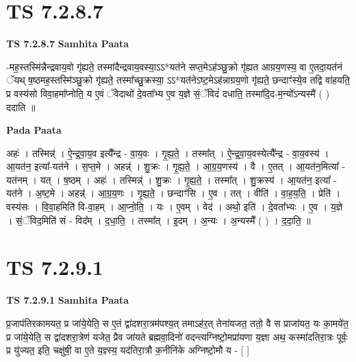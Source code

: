 \documentclass[17pt]{extarticle}
\begin{document}
\section*{ TS 7.2.8.7 }

\textbf{TS 7.2.8.7 } \newline
\textbf{Samhita Paata} \newline

-मह॒स्तस्मि॑न्नैन्द्रवाय॒वो गृ॑ह्यते॒ तस्मा॑दैन्द्रवाय॒वस्या॒ऽऽ*यत॑ने सप्त॒मेऽह॑ञ्छु॒क्रो गृ॑ह्यत आग्रय॒णस्य॒ वा ए॒तदा॒यत॑नं ॅयथ् ष॒ष्ठमह॒स्तस्मि॑ञ्छु॒क्रो गृ॑ह्यते॒ तस्मा᳚च्छु॒क्रस्या॒ ऽऽ*यत॑नेऽष्ट॒मेऽह॑न्नाग्रय॒णो गृ॑ह्यते॒ छन्दाꣳ॑स्ये॒व तद्वि वा॑हयति॒ प्र वस्य॑सो विवा॒हमा᳚प्नोति॒ य ए॒वं ॅवेदाथो॑ दे॒वता᳚भ्य ए॒व य॒ज्ञे सं॒ॅविदं॑ दधाति॒ तस्मा॑दि॒द-म॒न्यो᳚ऽन्यस्मै॑ ( ) ददाति ॥ \newline

\textbf{Pada Paata} \newline

अहः॑ । तस्मिन्न्॑ । ऐ॒न्द्र॒वा॒य॒व इत्यै᳚न्द्र - वा॒य॒वः । गृ॒ह्य॒ते॒ । तस्मा᳚त् । ऐ॒न्द्र॒वा॒य॒वस्येत्यै᳚न्द्र - वा॒य॒वस्य॑ । आ॒यत॑न॒ इत्या᳚-यत॑ने । स॒प्त॒मे । अहन्न्॑ । शु॒क्रः । गृ॒ह्य॒ते॒ । आ॒ग्र॒य॒णस्य॑ । वै । ए॒तत् । आ॒यत॑न॒मित्या᳚ - यत॑नम् । यत् । ष॒ष्ठम् । अहः॑ । तस्मिन्न्॑ । शु॒क्रः । गृ॒ह्य॒ते॒ । तस्मा᳚त् । शु॒क्रस्य॑ । आ॒यत॑न॒ इत्या᳚ - यत॑ने । अ॒ष्ट॒मे । अहन्न्॑ । आ॒ग्र॒य॒णः । गृ॒ह्य॒ते॒ । छन्दाꣳ॑सि । ए॒व । तत् । वीति॑ । वा॒ह॒य॒ति॒ । प्रेति॑ । वस्य॑सः । वि॒वा॒हमिति॑ वि-वा॒हम् । आ॒प्नो॒ति॒ । यः । ए॒वम् । वेद॑ । अथो॒ इति॑ । दे॒वता᳚भ्यः । ए॒व । य॒ज्ञे । सं॒ॅविद॒मिति॑ सं - विद᳚म् । द॒धा॒ति॒ । तस्मा᳚त् । इ॒दम् । अ॒न्यः । अ॒न्यस्मै᳚ ( ) । द॒दा॒ति॒ ॥  \newline




\section*{ TS 7.2.9.1 }

\textbf{TS 7.2.9.1 } \newline
\textbf{Samhita Paata} \newline

प्र॒जाप॑तिरकामयत॒ प्र जा॑ये॒येति॒ स ए॒तं द्वा॑दशरा॒त्रम॑पश्य॒त् तमाऽह॑र॒त् तेना॑यजत॒ ततो॒ वै स प्राजा॑यत॒ यः का॒मये॑त॒ प्र जा॑ये॒येति॒ स द्वा॑दशरा॒त्रेण॑ यजेत॒ प्रैव जा॑यते ब्रह्मवा॒दिनो॑ वदन्त्यग्निष्टो॒मप्रा॑यणा य॒ज्ञा अथ॒ कस्मा॑दतिरा॒त्रः पूर्वः॒ प्र यु॑ज्यत॒ इति॒ चक्षु॑षी॒ वा ए॒ते य॒ज्ञ्स्य॒ यद॑तिरा॒त्रौ क॒नीनि॑के अग्निष्टो॒मौ य - [  ] \newline
\end{document}
